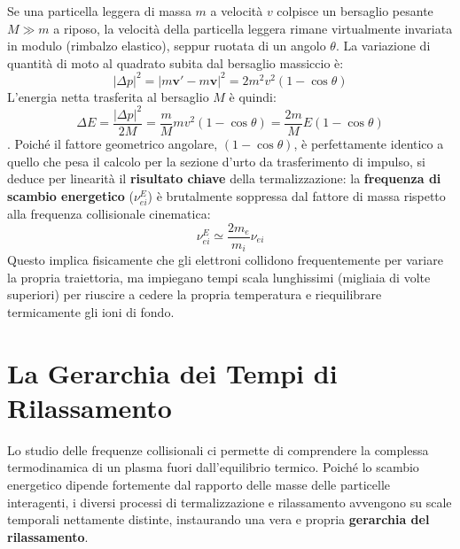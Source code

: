 Se una particella leggera di massa $m$ a velocità $v$ colpisce un bersaglio pesante $M \gg m$ a riposo, la velocità della particella leggera rimane virtualmente invariata in modulo (rimbalzo elastico), seppur ruotata di un angolo $\theta$. La variazione di quantità di moto al quadrato subita dal bersaglio massiccio è:
\begin{equation}
|\Delta p|^2 = |m\mathbf{v}' - m\mathbf{v}|^2 = 2m^2v^2(1 - \cos\theta)
\end{equation}
L'energia netta trasferita al bersaglio $M$ è quindi:
\begin{equation}
\Delta E = \frac{|\Delta p|^2}{2M} = \frac{m}{M} m v^2 (1 - \cos\theta) = \frac{2m}{M} E (1 - \cos\theta)
\end{equation}
.
Poiché il fattore geometrico angolare, $(1 - \cos\theta)$, è perfettamente identico a quello che pesa il calcolo per la sezione d'urto da trasferimento di impulso, si deduce per linearità il \textbf{risultato chiave} della termalizzazione: la \textbf{frequenza di scambio energetico} ($\nu_{ei}^E$) è brutalmente soppressa dal fattore di massa rispetto alla frequenza collisionale cinematica:
\begin{equation}
\nu_{ei}^E \simeq \frac{2m_e}{m_i} \nu_{ei}
\end{equation}
Questo implica fisicamente che gli elettroni collidono frequentemente per variare la propria traiettoria, ma impiegano tempi scala lunghissimi (migliaia di volte superiori) per riuscire a cedere la propria temperatura e riequilibrare termicamente gli ioni di fondo.

\section{La Gerarchia dei Tempi di Rilassamento}

Lo studio delle frequenze collisionali ci permette di comprendere la complessa termodinamica di un plasma fuori dall'equilibrio termico. Poiché lo scambio energetico dipende fortemente dal rapporto delle masse delle particelle interagenti, i diversi processi di termalizzazione e rilassamento avvengono su scale temporali nettamente distinte, instaurando una vera e propria \textbf{gerarchia del rilassamento}.

